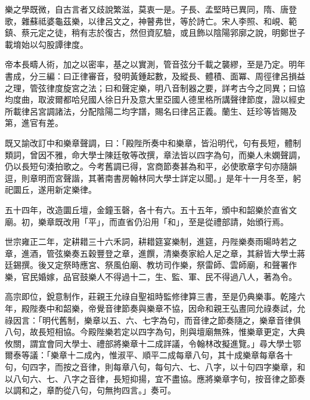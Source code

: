\begin{pinyinscope}
樂之學既微，自古言者又歧說繁滋，莫衷一是。子長、孟堅時已異同，隋、唐登歌，雜蘇祗婆龜茲樂，以律呂文之，神瞽弗世，等於詩亡。宋人李照、和峴、範鎮、蔡元定之徒，稍有志於復古，然但資肊驗，或且飾以陰陽郛廓之說，明鄭世子載堉始以勾股譚律度。

帝本長疇人術，加之以密率，基之以實測，管音弦分千載之襲繆，至是乃定。明年書成，分三編：曰正律審音，發明黃鍾起數，及縱長、體積、面冪、周徑律呂損益之理，管弦律度旋宮之法；曰和聲定樂，明八音制器之要，詳考古今之同異；曰協均度曲，取波爾都哈兒國人徐日升及意大里亞國人德里格所講聲律節度，證以經史所載律呂宮調諸法，分配陰陽二均字譜，賜名曰律呂正義。蘭生、廷珍等皆賜及第，進官有差。

既又諭改訂中和樂章聲調，曰：「殿陛所奏中和樂章，皆沿明代，句有長短，體制類詞，曾因不雅，命大學士陳廷敬等改撰，章法皆以四字為句，而樂人未嫻聲調，仍以長短句湊拍歌之。今考舊調已得，宮商節奏甚為和平，必使歌章字句亦隨韻逗，則章明而宮聲諧，其著南書房翰林同大學士詳定以聞。」是年十一月冬至，躬祀圜丘，遂用新定樂律。

五十四年，改造圜丘壇，金鐘玉磬，各十有六。五十五年，頒中和韶樂於直省文廟。初，樂章既改用「平」，而直省仍沿用「和」，至是從禮部請，始頒行焉。

世宗雍正二年，定耕耤三十六禾詞，耕耤筵宴樂制，進筵，丹陛樂奏雨暘時若之章，進酒，管弦樂奏五穀豐登之章，進饌，清樂奏家給人足之章，其辭皆大學士蔣廷錫撰。後又定祭時應宮、祭風伯廟、教坊司作樂，祭雷師、雲師廟，和聲署作樂，官民婚嫁，品官鼓樂人不得過十二，生、監、軍、民不得過八人，著為令。

高宗即位，銳意制作，莊親王允祿自聖祖時監修律算三書，至是仍典樂事。乾隆六年，殿陛奏中和韶樂，帝覺音律節奏與樂章不協，因命和親王弘晝同允祿奏試，允祿因言：「明代舊制，樂章以五、六、七字為句，而音律之節奏隨之，樂章音律俱八句，故長短相協。今殿陛樂若定以四字為句，則與壇廟無殊，惟樂章更定，大典攸關，謂宜會同大學士、禮部將樂章十二成詳議，令翰林改擬進覽。」尋大學士鄂爾泰等議：「樂章十二成內，惟淑平、順平二成每章八句，其十成樂章每章各十句，句四字，而按之音律，則每章八句，每句六、七、八字，以十句四字樂章，和以八句六、七、八字之音律，長短抑揚，宜不盡協。應將樂章字句，按音律之節奏以調和之，章酌從八句，句無拘四言。」奏可。


\end{pinyinscope}
